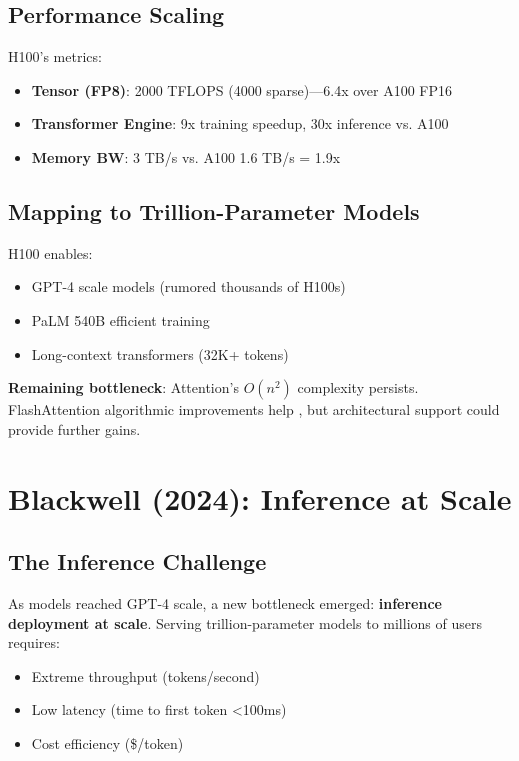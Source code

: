 \documentclass{article}
\begin{document}
\subsection{Performance Scaling}

H100's metrics:
\begin{itemize}
\item \textbf{Tensor (FP8)}: 2000 TFLOPS (4000 sparse)—6.4x over A100 FP16
\item \textbf{Transformer Engine}: 9x training speedup, 30x inference vs. A100
\item \textbf{Memory BW}: 3 TB/s vs. A100 1.6 TB/s = 1.9x
\end{itemize}

\subsection{Mapping to Trillion-Parameter Models}

H100 enables:
\begin{itemize}
\item GPT-4 scale models (rumored thousands of H100s)
\item PaLM 540B efficient training
\item Long-context transformers (32K+ tokens)
\end{itemize}

\textbf{Remaining bottleneck}: Attention's $O(n^2)$ complexity persists. FlashAttention algorithmic improvements help \cite{dao2022flashattention}, but architectural support could provide further gains.

\section{Blackwell (2024): Inference at Scale}

\subsection{The Inference Challenge}

As models reached GPT-4 scale, a new bottleneck emerged: \textbf{inference deployment at scale}. Serving trillion-parameter models to millions of users requires:
\begin{itemize}
\item Extreme throughput (tokens/second)
\item Low latency (time to first token <100ms)
\item Cost efficiency (\$/token)
\end{itemize}
\end{document}
